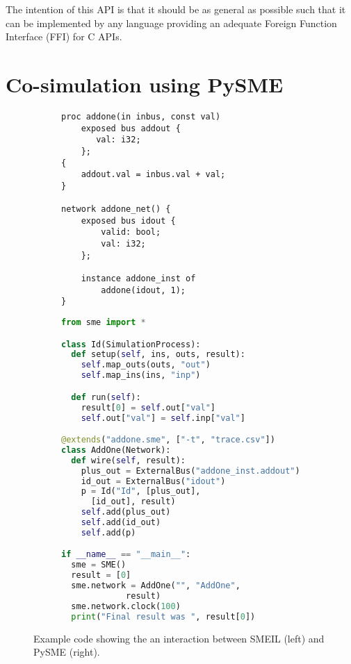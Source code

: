The intention of this API is that it should be as general as possible such that
it can be implemented by any language providing an adequate Foreign Function
Interface (FFI) for C APIs.

\section{Co-simulation using PySME}

\begin{figure}
  \centerfloat
  \begin{subfigure}[t]{0.40\paperwidth}
\begin{lstlisting}[language=smeil]
proc addone(in inbus, const val)
    exposed bus addout {
       val: i32;
    };
{
    addout.val = inbus.val + val;
}

network addone_net() {
    exposed bus idout {
        valid: bool;
        val: i32;
    };

    instance addone_inst of
        addone(idout, 1);
}
\end{lstlisting}
    
  \end{subfigure}
  \begin{subfigure}[t]{0.40\paperwidth}
    \begin{lstlisting}[language=python]
from sme import *

class Id(SimulationProcess):
  def setup(self, ins, outs, result):
    self.map_outs(outs, "out")
    self.map_ins(ins, "inp")

  def run(self):
    result[0] = self.out["val"]
    self.out["val"] = self.inp["val"]

@extends("addone.sme", ["-t", "trace.csv"])
class AddOne(Network):
  def wire(self, result):
    plus_out = ExternalBus("addone_inst.addout")
    id_out = ExternalBus("idout")
    p = Id("Id", [plus_out],
      [id_out], result)
    self.add(plus_out)
    self.add(id_out)
    self.add(p)

if __name__ == "__main__":
  sme = SME()
  result = [0]
  sme.network = AddOne("", "AddOne",
             result)
  sme.network.clock(100)
  print("Final result was ", result[0])
  \end{lstlisting}
  \end{subfigure}

  \caption{Example code showing the an interaction between SMEIL (left) and PySME
    (right).}
\label{fig:smeilpy}
\end{figure}

